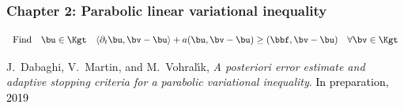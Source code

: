 \begin{frame}
\frametitle{Chapter 2: Parabolic linear variational inequality}

\begin{equation*}
\mbox{Find} \quad \bu \in \Kgt \quad \langle \partial_t \bu, \bv - \bu \rangle + a(\bu,\bv-\bu) \geq (\bbf,\bv-\bu) \quad \forall \bv \in \Kgt
\end{equation*}
\vspace*{-1 cm}
\begin{figure}
\vspace{0.4 cm}
\end{figure}


\begin{thebibliography}{10}
 \scriptsize{
 {\sc J.~Dabaghi, V.~Martin, and M.~Vohral{\'{\i}}k}, {\em A posteriori error estimate and adaptive stopping criteria for a parabolic variational inequality}.
 \textcolor{black}{In preparation, 2019}
 }
\end{thebibliography}

\end{frame}
%
